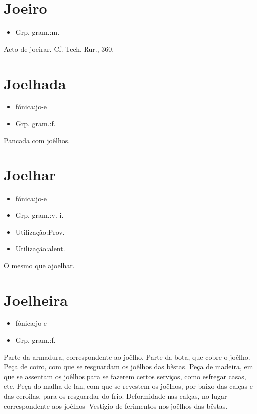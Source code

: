 \documentclass{article}
\begin{document}
\section{Joeiro}
\begin{itemize}
\item {Grp. gram.:m.}
\end{itemize}
Acto de joeirar. Cf. \textunderscore Tech. Rur.\textunderscore , 360.
\section{Joelhada}
\begin{itemize}
\item {fónica:jo-e}
\end{itemize}
\begin{itemize}
\item {Grp. gram.:f.}
\end{itemize}
Pancada com joêlhos.
\section{Joelhar}
\begin{itemize}
\item {fónica:jo-e}
\end{itemize}
\begin{itemize}
\item {Grp. gram.:v. i.}
\end{itemize}
\begin{itemize}
\item {Utilização:Prov.}
\end{itemize}
\begin{itemize}
\item {Utilização:alent.}
\end{itemize}
O mesmo que \textunderscore ajoelhar\textunderscore .
\section{Joelheira}
\begin{itemize}
\item {fónica:jo-e}
\end{itemize}
\begin{itemize}
\item {Grp. gram.:f.}
\end{itemize}
Parte da armadura, correspondente ao joêlho.
Parte da bota, que cobre o joêlho.
Peça de coiro, com que se resguardam os joêlhos das bêstas.
Peça de madeira, em que se assentam os joêlhos para se fazerem certos serviços, como esfregar casas, etc.
Peça do malha de lan, com que se revestem os joêlhos, por baixo das calças e das ceroilas, para os resguardar do frio.
Deformidade nas calças, no lugar correspondente aos joêlhos.
Vestígio de ferimentos nos joêlhos das bêstas.
\end{document}

